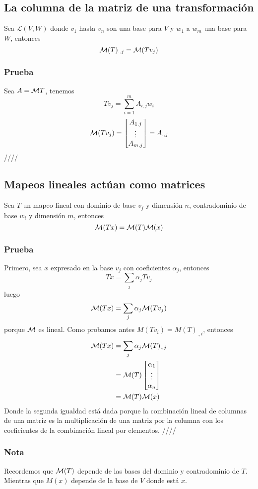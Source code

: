 \documentclass{article}
\begin{document}
\subsection{La columna de la matriz de una transformación}
Sea $\mathcal{L}(V,W)$ donde $v_1$ hasta $v_n$ son una base para $V$
y $w_1$ a $w_m$ una base para $W$, entonces
$$\mathcal{M}(T)_{.,j} = \mathcal{M} (Tv_j)$$
\subsubsection*{Prueba}
Sea $A=\mathcal{M} T$, tenemos
$$Tv_j = \sum^m_{i=1}A_{i,j} w_i$$
$$\mathcal{M}(Tv_j) = \begin{bmatrix}
    A_{1,j}\\
    \vdots\\
    A_{m,j}
\end{bmatrix}
=
A_{.,j}$$
\hfill ////

\subsection{Mapeos lineales actúan como matrices}
Sea $T$ un mapeo lineal con dominio de base $v_j$ y dimensión $n$,
contradominio de base $w_i$ y dimensión $m$, entonces
$$\mathcal{M} (Tx) = \mathcal{M} (T)\mathcal{M} (x)$$
\subsubsection*{Prueba}
Primero, sea $x$ expresado en la base $v_j$ con coeficientes $\alpha_j$,
entonces $$Tx =\sum_j\alpha_j Tv_j$$
luego $$\mathcal{M}(Tx)=\sum_j\alpha_j\mathcal{M}(Tv_j)$$
porque $\mathcal{M}$ es lineal. Como probamos antes
$M(Tv_i) = M(T)_{.,i}$, entonces
\begin{align*}
    \mathcal{M}(Tx) &= \sum_j\alpha_j\mathcal{M}(T)_{.,j}\\
    &= \mathcal{M}(T) \begin{bmatrix}
        \alpha_1 \\
        \vdots \\
        \alpha_n
    \end{bmatrix}\\
    &= \mathcal{M}(T)\mathcal{M}(x)
\end{align*}
Donde la segunda igualdad está dada porque la combinación
lineal de columnas de una matriz es la multiplicación de una matriz
por la columna con los coeficientes de la combinación lineal por 
elementos. \hfill ////

\subsubsection{Nota}
Recordemos que $\mathcal{M}(T)$ depende de las bases del dominio y 
contradominio de $T$. Mientras que $M(x)$ depende de la base
de $V$ donde está $x$.
\end{document}
